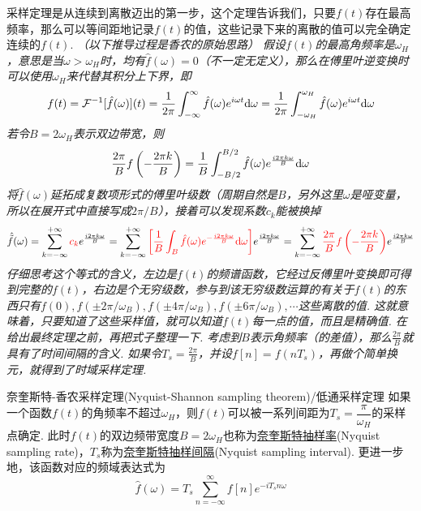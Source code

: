 \documentclass[main.tex]{subfiles}
\begin{document}
采样定理是从连续到离散迈出的第一步，这个定理告诉我们，只要\(f(t)\)存在最高频率，那么可以等间距地记录\(f(t)\)的值，这些记录下来的离散的值可以完全确定连续的\(f(t)\).
\textit{
\newline
（以下推导过程是香农的原始思路）
\newline
假设\(f(t)\)的最高角频率是\(\omega_H\)，意思是当\(\omega > \omega_H\)时，均有\(\hat{f}(\omega)=0\)（不一定无定义），那么在傅里叶逆变换时可以使用\(\omega_H\)来代替其积分上下界，即
\[f(t) = \mathcal{F}^{-1}[\hat{f}(\omega)](t) = \frac{1}{2\pi}\int_{-\infty}^{\infty}\hat{f}(\omega)e^{i\omega t}{\rm d}\omega = \frac{1}{2\pi}\int_{-\omega_H}^{\omega_H}\hat{f}(\omega)e^{i\omega t}{\rm d}\omega\]
若令\(B=2\omega_H\)表示双边带宽，则
\[\frac{2\pi}{B}f\left(-\frac{2\pi k}{B}\right) = \frac{1}{B}\int_{-B/2}^{B/2}\hat{f}(\omega)e^{\frac{i2\pi k\omega}{B}}{\rm d}\omega\]
将\(\hat{f}(\omega)\)延拓成复数项形式的傅里叶级数（周期自然是\(B\)，另外这里\(\omega\)是哑变量，所以在展开式中直接写成\(2\pi/B\)），接着可以发现系数\(c_k\)能被换掉
\[ \hat{\tilde{f}}(\omega) = \sum_{k=-\infty}^{+\infty}{\color{red} c_k}e^{\frac{i2\pi k\omega}{B}} 
= \sum_{k=-\infty}^{+\infty} {\color{red} \left[\frac{1}{B} \int_{B}\hat{f}(\omega)e^{-\frac{i2\pi k\omega}{B}}{\rm d}\omega\right]}e^{\frac{i2\pi k\omega}{B}} 
= \sum_{k=-\infty}^{+\infty} {\color{red} \frac{2\pi}{B}f\left(-\frac{2\pi k}{B}\right)}e^{\frac{i2\pi k\omega}{B}}\]
仔细思考这个等式的含义，左边是\(f(t)\)的频谱函数，它经过反傅里叶变换即可得到完整的\(f(t)\)，右边是个无穷级数，参与到该无穷级数运算的有关于\(f(t)\)的东西只有\(f(0), f(\pm 2\pi/\omega_B), f(\pm 4\pi/\omega_B), f(\pm 6\pi/\omega_B), \cdots\)这些离散的值. 这就意味着，只要知道了这些采样值，就可以知道\(f(t)\)每一点的值，而且是精确值.
\newline
在给出最终定理之前，再把式子整理一下. 考虑到\(B\)表示角频率（的差值），那么\(\displaystyle{\frac{2\pi}{B}}\)就具有了时间间隔的含义. 如果令\(\displaystyle{T_s=\frac{2\pi}{B}}\)，并设\(\displaystyle{f[n]=f(nT_s)}\)，再做个简单换元，就得到了时域采样定理.
}

\begin{theorem}{奈奎斯特-香农采样定理(Nyquist-Shannon sampling theorem)/低通采样定理}
    如果一个函数\(f(t)\)的角频率不超过\(\omega_H\)，则\(f(t)\)可以被一系列间距为\(T_s=\dfrac{\pi}{\omega_H}\)的采样点确定. 此时\(f(t)\)的双边频带宽度\(B=2\omega_H\)也称为\uline{奈奎斯特抽样率}(Nyquist sampling rate)，\(T_s\)称为\uline{奈奎斯特抽样间隔}(Nyquist sampling interval). 更进一步地，该函数对应的频域表达式为
    \[\hat{f}(\omega) = T_s \sum_{n=-\infty}^{\infty}f[n]e^{-iT_sn\omega}\]
\end{theorem}
\end{document}
